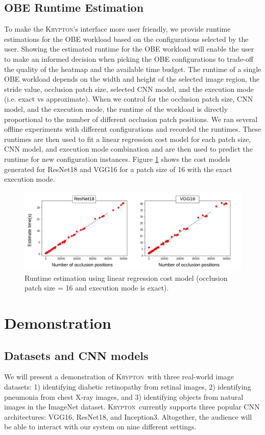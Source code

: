 \documentclass{vldb}
\newcommand{\system}{\textsc{Krypton}}
\begin{document}
\subsection{OBE Runtime Estimation}
To make the \system's interface more user friendly, we provide runtime estimations for the OBE workload based on the configurations selected by the user.
Showing the estimated runtime for the OBE workload will enable the user to make an informed decision when picking the OBE configurations to trade-off the quality of the heatmap and the available time budget.
The runtime of a single OBE workload depends on the width and height of the selected image region, the stride value, occlusion patch size, selected CNN model, and the execution mode (i.e. exact vs approximate).
When we control for the occlusion patch size, CNN model, and the execution mode, the runtime of the workload is directly proportional to the number of different occlusion patch positions.
We ran several offline experiments with different configurations and recorded the runtimes.
These runtimes are then used to fit a linear regression cost model for each patch size, CNN model, and execution mode combination and are then used to predict the runtime for new configuration instances.
Figure \ref{fig:runtime_estimation} shows the cost models generated for ResNet18 and VGG16 for a patch size of 16 with the exact execution mode.

\begin{figure}
\includegraphics[width=\columnwidth]{images/runtime_estimation.pdf}
\caption{Runtime estimation using linear regression cost model (occlusion patch size = 16 and execution mode is exact).}
\label{fig:runtime_estimation}
\vspace{-2mm}
\end{figure}


\section{Demonstration}\label{demonstration}
\subsection{Datasets and CNN models}
We will present a demonstration of \system ~with three real-world image datasets: 1) identifying diabetic retinopathy from retinal images, 2) identifying pneumonia from chest X-ray images, and 3) identifying objects from natural images in the ImageNet dataset.
\system~currently supports three popular CNN architectures: VGG16, ResNet18, and Inception3. Altogether, the audience will be able to interact with our system on nine different settings.
\end{document}
